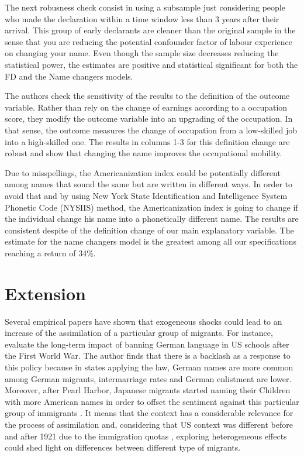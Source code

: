 \documentclass[12pt]{article}
\begin{document}
\medskip

 The next robusness check consist in using a subsample just considering people who made the declaration within a time window less than 3 years after their arrival. This group of early declarants are cleaner than the original sample in the sense that you are reducing the potential confounder factor of labour experience on changing your name. Even though the sample size decreases reducing the statistical power, the estimates are positive and statistical significant for both the FD and the Name changers models. 
 
 \medskip
 
 The authors check the sensitivity of the results to the definition of the outcome variable. Rather than rely on the change of earnings according to a occupation score, they modify the outcome variable into an upgrading of the occupation. In that sense, the outcome measures the change of occupation from a low-skilled job into a high-skilled one. The results in columns 1-3 for this definition change are robust and show that changing the name improves the occupational mobility. 
 
 \medskip 
 
 Due to misspellings, the Americanization index could be potentially different among names that sound the same but are written in different ways. In order to avoid that and by using New York
 State Identification and Intelligence System Phonetic Code (NYSIIS) method, the Americanization index is going to change if the individual change his name into a phonetically different name. The results are consistent despite of the definition change of our main explanatory variable. The estimate for the name changers model is the greatest among all our specifications reaching a return of 34\%. 
 
 
 
 \section{Extension}
 
 Several empirical papers have shown that exogeneous shocks could lead to an increase of the assimilation of a particular group of migrants. For instance, \cite{fouka2016backlash} evaluate the long-term impact of banning German language in US schools after the First World War. The author finds that there is a backlash as a response to this policy because in states applying the law, German names are more common among German migrants, intermarriage rates and German enlistment are lower. Moreover, after Pearl Harbor, Japanese migrants started naming their Children with more American names in order to offset the sentiment against this particular group of immigrants \citep{saavedra2018kenji}. It means that the context has a considerable relevance for the process of assimilation and, considering that US context was different before and after 1921 due to the immigration quotas \citep{ward2017birds}, exploring heterogeneous effects could shed light on differences between different type of migrants. 
 
\end{document}
